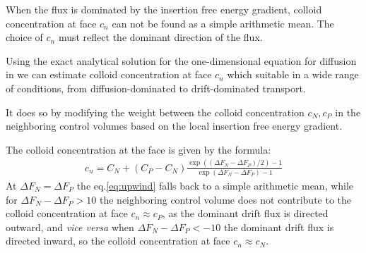 \documentclass[10pt, a4paper]{article}
\begin{document}
\begin{multicols}{2}
When the flux is dominated by the insertion free energy gradient, colloid concentration at face $c_n$ can not be found as a simple arithmetic mean. 
The choice of $c_n$ must reflect the dominant direction of the flux.

Using the exact analytical solution for the one-dimensional equation for diffusion in we can estimate colloid concentration at face $c_n$ which suitable in a wide range of conditions, from diffusion-dominated to drift-dominated transport.

It does so by modifying the weight between the colloid concentration $c_N, c_P$ in the neighboring control volumes based on the local insertion free energy gradient.

The colloid concentration at the face is given by the formula:
\begin{eqnarray}
    \label{eq:upwind}
    c_n = C_N + (C_P - C_N)\frac{\exp((\Delta F_N - \Delta F_P)/2)-1}{\exp(\Delta F_N - \Delta F_P) - 1}
\end{eqnarray}
At $\Delta F_N = \Delta F_P$ the eq.\ref{eq:upwind} falls back to a simple arithmetic mean, while for $\Delta F_N - \Delta F_P>10$ the neighboring control volume does not contribute to the colloid concentration at face $c_n \approx c_P$, as the dominant drift flux is directed outward, and \emph{vice versa} when $\Delta F_N - \Delta F_P< -10$ the dominant drift flux is directed inward, so the colloid concentration at face $c_n \approx c_N$.



    
\end{multicols}



\end{document}
